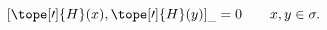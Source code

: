 \begin{equation}	\label{12.30}
[\tope[\prime]{H}(x) , \tope[\prime]{H}(y)]_{\_} = 0
\qquad
x,y\in\sigma .
	\end{equation}


